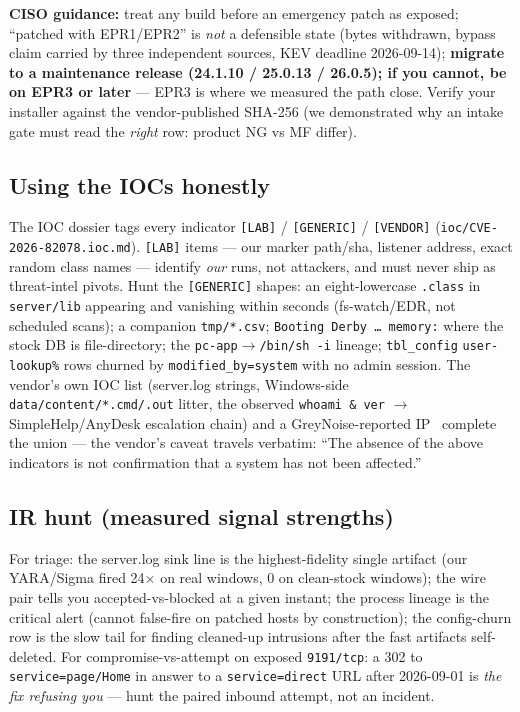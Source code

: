 \documentclass[journal]{IEEEtran}
\begin{document}
\textbf{CISO guidance:} treat any build before an emergency patch as exposed;
``patched with EPR1/EPR2'' is \emph{not} a defensible state (bytes withdrawn,
bypass claim carried by three independent sources, KEV deadline 2026-09-14);
\textbf{migrate to a maintenance release (24.1.10 / 25.0.13 / 26.0.5); if you
cannot, be on EPR3 or later} — EPR3 is where we measured the path close.
Verify your installer against the vendor-published SHA-256 (we demonstrated why
an intake gate must read the \emph{right} row: product NG vs MF differ).

\subsection{Using the IOCs honestly}
The IOC dossier tags every indicator \texttt{[LAB]} / \texttt{[GENERIC]} /
\texttt{[VENDOR]} (\texttt{ioc/CVE-2026-82078.ioc.md}). \texttt{[LAB]} items —
our marker path/sha, listener address, exact random class names — identify
\emph{our} runs, not attackers, and must never ship as threat-intel pivots.
Hunt the \texttt{[GENERIC]} shapes: an eight-lowercase \texttt{.class} in
\texttt{server/lib} appearing and vanishing within seconds (fs-watch/EDR, not
scheduled scans); a companion \texttt{tmp/*.csv}; \texttt{Booting Derby \ldots
memory:} where the stock DB is file-directory; the
\texttt{pc-app}$\rightarrow$\texttt{/bin/sh -i} lineage; \texttt{tbl\_config}
\texttt{user-lookup\%} rows churned by \texttt{modified\_by=system} with no
admin session. The vendor's own IOC list (server.log strings, Windows-side
\texttt{data/content/*.cmd/.out} litter, the observed
\texttt{whoami \& ver} $\rightarrow$ SimpleHelp/AnyDesk escalation chain) and
a GreyNoise-reported IP~\cite{nothreat} complete the union — the vendor's
caveat travels verbatim: ``The absence of the above indicators is not
confirmation that a system has not been affected.''

\subsection{IR hunt (measured signal strengths)}
For triage: the server.log sink line is the highest-fidelity single artifact
(our YARA/Sigma fired 24$\times$ on real windows, 0 on clean-stock windows);
the wire pair tells you accepted-vs-blocked at a given instant; the process
lineage is the critical alert (cannot false-fire on patched hosts by
construction); the config-churn row is the slow tail for finding
cleaned-up intrusions after the fast artifacts self-deleted. For
compromise-vs-attempt on exposed \texttt{9191/tcp}: a 302 to
\texttt{service=page/Home} in answer to a \texttt{service=direct} URL after
2026-09-01 is \emph{the fix refusing you} — hunt the paired inbound attempt,
not an incident.
\end{document}
